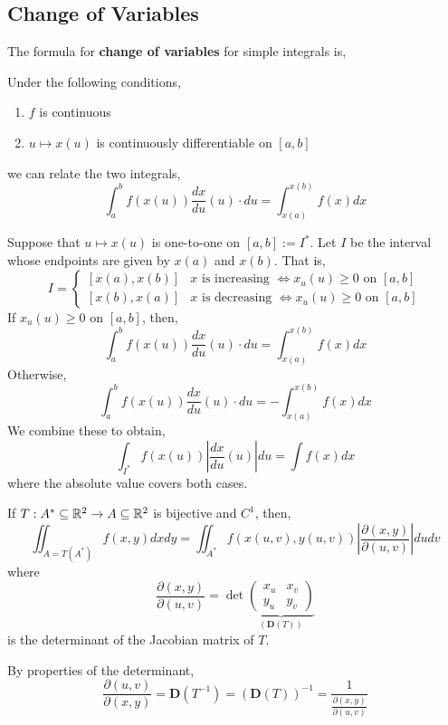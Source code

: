 \subsection{Change of Variables}
The formula for \textbf{change of variables} for simple integrals is,
\begin{thm}
    Under the following conditions,
    \begin{enumerate}
        \item $f$ is continuous
        \item $u \mapsto x(u)$ is continuously differentiable on $[a,b]$
    \end{enumerate}
    we can relate the two integrals,
    \[\int_a^b f(x(u)) \frac{d x}{d u}(u) \cdot d u = \int_{x(a)}^{x(b)} f(x) dx\]
\end{thm}

\noindent Suppose that $u \mapsto x(u)$ is one-to-one on $[a,b] := I^*$. Let $I$ be the interval whose endpoints are given by $x(a)$ and $x(b)$. That is,
\[I=\begin{cases}
    [x(a), x(b)] & x \text { is increasing } \iff x_u(u) \geq 0 \text{ on } [a,b] \\
    [x(b), x(a)] & x \text { is decreasing } \iff x_u(u) \geq 0 \text{ on } [a,b]
\end{cases}\]
If $x_u(u) \geq 0 \text{ on } [a,b]$, then,
\[\int_a^b f(x(u)) \frac{d x}{d u}(u) \cdot d u = \int_{x(a)}^{x(b)} f(x) dx\]
Otherwise,
\[\int_a^b f(x(u)) \frac{d x}{d u}(u) \cdot d u = -\int_{x(a)}^{x(b)} f(x) dx\]
We combine these to obtain,
\[\int_{I^*} f(x(u))\left|\frac{d x}{d u}(u)\right| d u=\int f(x) d x\]
where the absolute value covers both cases.

\begin{thm}
    If $T: A^* \subseteq \mathbb{R}^2 \rightarrow A \subseteq \mathbb{R}^2$ is bijective and $C^1$, then,
    \[\iint_{A = T(A^*)} f(x,y) dx dy = \iint_{A^*}f(x(u,v), y(u,v)) \left|\frac{\partial(x, y)}{\partial(u, v)}\right| d u d v\]
    where 
    \[\frac{\partial(x, y)}{\partial(u, v)} = \operatorname{det}\underbrace{\left(\begin{array}{ll}
x_u & x_v \\
y_u & y_v
\end{array}\right)}_{(\mathbf{D}(T))}\]
is the determinant of the Jacobian matrix of $T$.
\end{thm}

\begin{rmk}
    By properties of the determinant,
    \[\frac{\partial(u, v)}{\partial(x, y)}=\mathbf{D}(T^{-1}) = (\mathbf{D}(T))^{-1}=\frac{1}{\frac{\partial(x, y)}{\partial(u, v)}}\]
\end{rmk}

